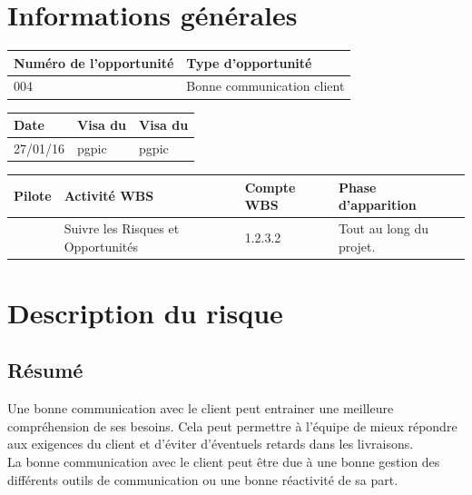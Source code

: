 \section*{Informations générales}
 
\begin{table}[h]
\centering
	\begin{tabularx}{16.8cm}{|X|X|}
	\hline
	Numéro de l'opportunité & Type d'opportunité \\
	\hline
	004 & Bonne communication client \\
	\hline
	\end{tabularx}
\end{table}

\begin{table}[h]
\centering
	\begin{tabularx}{16.8cm}{|X|X|X|}
	\hline
	Date & Visa du \RQ & Visa du \CP \\
	\hline
	 27/01/16 & pgpic & pgpic \\
	\hline
	\end{tabularx}
\end{table}

\begin{table}[h]
\centering
	\begin{tabularx}{16.8cm}{|X|X|X|X|}
	\hline
	Pilote & Activité WBS & Compte WBS & Phase d'apparition \\
	\hline
	 \Florian & Suivre les Risques et Opportunités & 1.2.3.2 & Tout au long du projet.\\
	\hline
	\end{tabularx}
\end{table}

\section*{Description du risque}

\subsection*{Résumé}
	Une bonne communication avec le client peut entrainer une meilleure compréhension de ses besoins. Cela peut permettre à l'équipe \PICCourt de mieux répondre aux exigences du client et d'éviter d'éventuels retards dans les livraisons. \\
        La bonne communication avec le client peut être due à une bonne gestion des différents outils de communication ou une bonne réactivité de sa part.
	
